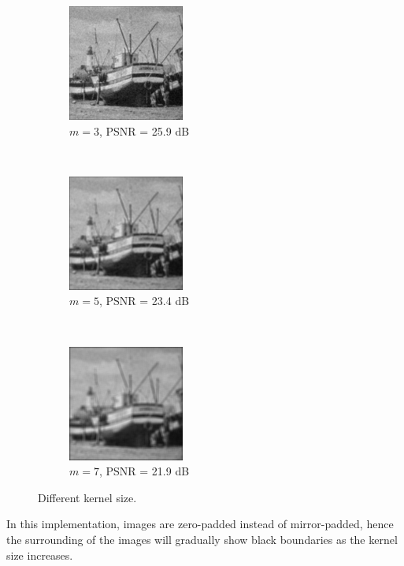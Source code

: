 \documentclass[12pt]{article}
\begin{document}
\begin{figure}[ht!]
    \centering
    \begin{subfigure}[t]{0.3\textwidth}
        \centering
        \includegraphics[height=1.5in]{images/Rg}
        \caption{$m=3$, PSNR = 25.9 dB}
    \end{subfigure}%
    ~ 
    \begin{subfigure}[t]{0.3\textwidth}
        \centering
        \includegraphics[height=1.5in]{images/Rg_5}
        \caption{$m=5$, PSNR = 23.4 dB}
    \end{subfigure}%
    ~
    \begin{subfigure}[t]{0.3\textwidth}
        \centering
        \includegraphics[height=1.5in]{images/Rg_7}
        \caption{$m=7$, PSNR = 21.9 dB}
    \end{subfigure}
    \caption{Different kernel size.}
    \label{fig:g_ksz}
\end{figure}

In this implementation, images are zero-padded instead of mirror-padded, hence the surrounding of the images will gradually show black boundaries as the kernel size increases.

\newpage
\end{document}
